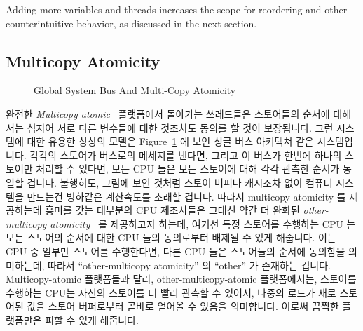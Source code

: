 Adding more variables and threads increases the scope for reordering
and other counterintuitive behavior, as discussed in the next section.
\fi

\subsection{Multicopy Atomicity}
\label{sec:memorder:Multicopy Atomicity}

\begin{figure}[tb]
\centering
{}
\caption{Global System Bus And Multi-Copy Atomicity}
\label{fig:memorder:Global System Bus And Multi-Copy Atomicity}
\end{figure}

완전한 \emph{Multicopy atomic}~\cite{Stone:1995:SP:623262.623912} 플랫폼에서
돌아가는 쓰레드들은 스토어들의 순서에 대해서는 심지어 서로 다른 변수들에 대한
것조차도 동의를 할 것이 보장됩니다.
그런 시스템에 대한 유용한 상상의 모델은
Figure~\ref{fig:memorder:Global System Bus And Multi-Copy Atomicity}
에 보인 싱글 버스 아키텍쳐 같은 시스템입니다.
각각의 스토어가 버스로의 메세지를 낸다면, 그리고 이 버스가 한번에 하나의
스토어만 처리할 수 있다면, 모든 CPU 들은 모든 스토어에 대해 각각 관측한 순서가
동일할 겁니다.
불행히도, 그림에 보인 것처럼 스토어 버퍼나 캐시조차 없이 컴퓨터 시스템을
만드는건 빙하같은 계산속도를 초래할 겁니다.
따라서 multicopy atomicity 를 제공하는데 흥미를 갖는 대부분의 CPU 제조사들은
그대신 약간 더 완화된
\emph{other-multicopy atomicity}~\cite[Section B2.3]{ARMv8A:2017} 를 제공하고자
하는데, 여기선 특정 스토어를 수행하는 CPU 는 모든 스토어의 순서에 대한 CPU 들의
동의로부터 배제될 수 있게 해줍니다.
이는 CPU 중 일부만 스토어를 수행한다면, 다른 CPU 들은 스토어들의 순서에
동의함을 의미하는데, 따라서 ``other-multicopy atomicity'' 의 ``other'' 가
존재하는 겁니다.
Multicopy-atomic 플랫폼들과 달리, other-multicopy-atomic 플랫폼에서는, 스토어를
수행하는 CPU는 자신의 스토어를 더 빨리 관측할 수 있어서, 나중의 로드가 새로
스토어된 값을 스토어 버퍼로부터 곧바로 얻어올 수 있음을 의미합니다.
이로써 끔찍한 플랫폼만은 피할 수 있게 해줍니다.
\iffalse

